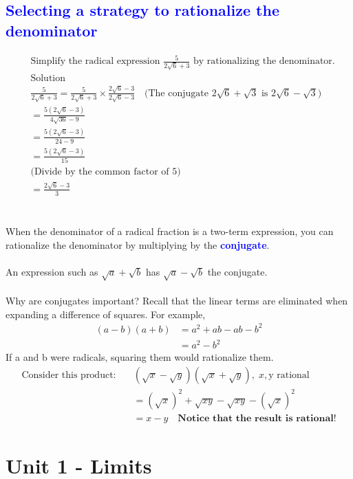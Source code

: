 \documentclass{article}
\begin{document}
\subsection*{\textcolor{blue}{Selecting a strategy to rationalize the denominator}}
\begin{align*}
&\text{Simplify the radical expression } \frac{5}{2 \sqrt{6}+3} \text{ by rationalizing the denominator.} \\
&\text{Solution} \\
&\frac{5}{2 \sqrt{6}+3} = \frac{5}{2 \sqrt{6}+3} \times \frac{2 \sqrt{6}-3}{2 \sqrt{6}-3} \quad \text{(The conjugate $2 \sqrt{6}+\sqrt{3}$ is $2 \sqrt{6}-\sqrt{3}$)} \\
&= \frac{5(2 \sqrt{6}-3)}{4 \sqrt{36}-9} \\
&= \frac{5(2 \sqrt{6}-3)}{24-9} \\
&= \frac{5(2 \sqrt{6}-3)}{15} \\
&\text{(Divide by the common factor of 5)} \\
&= \frac{2 \sqrt{6}-3}{3}
\end{align*}
\\\\
When the denominator of a radical fraction is a two-term expression, you can rationalize the denominator by multiplying by the \textbf{\textcolor{blue}{conjugate}}. \\ \\
An expression such as $\sqrt{a}+\sqrt{b}$ has $\sqrt{a}-\sqrt{b}$ the conjugate.\\\\
Why are conjugates important? Recall that the linear terms are eliminated when
expanding a difference of squares. For example,
\begin{align*}
    (a-b)(a+b)&=a^2+ab-ab-b^2 \\
    &=a^2-b^2
\end{align*}
If a and b were radicals, squaring them would rationalize them.
\begin{align*}
\text{Consider this product:}\quad
    &(\sqrt{x}-\sqrt{y})(\sqrt{x}+\sqrt{y}), \; x, \text{y rational} \\ &=(\sqrt{x})^2+\sqrt{xy}-\sqrt{xy}-(\sqrt{x})^2 \\
    &=x-y \quad \textbf{Notice that the result is rational!}
\end{align*}

\newpage
\section{Unit 1 - Limits}
\end{document}
